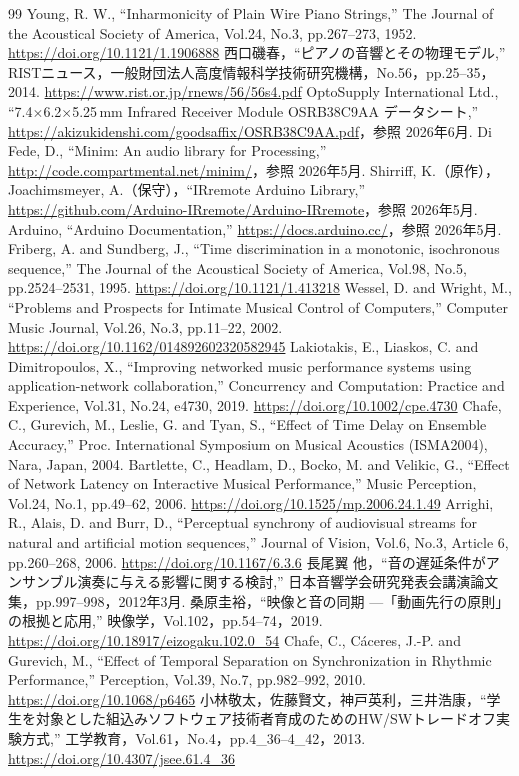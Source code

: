 \documentclass[uplatex,dvipdfmx]{jlreq}
\begin{document}
\begin{thebibliography}{99}
 Young, R. W., ``Inharmonicity of Plain Wire Piano Strings,'' The Journal of the Acoustical Society of America, Vol.24, No.3, pp.267--273, 1952. \url{https://doi.org/10.1121/1.1906888}
 西口磯春，``ピアノの音響とその物理モデル,'' RISTニュース，一般財団法人高度情報科学技術研究機構，No.56，pp.25--35，2014. \url{https://www.rist.or.jp/rnews/56/56s4.pdf}
 OptoSupply International Ltd., ``7.4$\times$6.2$\times$5.25\,mm Infrared Receiver Module OSRB38C9AA データシート,'' \url{https://akizukidenshi.com/goodsaffix/OSRB38C9AA.pdf}，参照 2026年6月.
 Di Fede, D., ``Minim: An audio library for Processing,'' \url{http://code.compartmental.net/minim/}，参照 2026年5月.
 Shirriff, K.（原作），Joachimsmeyer, A.（保守），``IRremote Arduino Library,'' \url{https://github.com/Arduino-IRremote/Arduino-IRremote}，参照 2026年5月.
 Arduino, ``Arduino Documentation,'' \url{https://docs.arduino.cc/}，参照 2026年5月.
 Friberg, A. and Sundberg, J., ``Time discrimination in a monotonic, isochronous sequence,'' The Journal of the Acoustical Society of America, Vol.98, No.5, pp.2524--2531, 1995. \url{https://doi.org/10.1121/1.413218}
 Wessel, D. and Wright, M., ``Problems and Prospects for Intimate Musical Control of Computers,'' Computer Music Journal, Vol.26, No.3, pp.11--22, 2002. \url{https://doi.org/10.1162/014892602320582945}
 Lakiotakis, E., Liaskos, C. and Dimitropoulos, X., ``Improving networked music performance systems using application-network collaboration,'' Concurrency and Computation: Practice and Experience, Vol.31, No.24, e4730, 2019. \url{https://doi.org/10.1002/cpe.4730}
 Chafe, C., Gurevich, M., Leslie, G. and Tyan, S., ``Effect of Time Delay on Ensemble Accuracy,'' Proc. International Symposium on Musical Acoustics (ISMA2004), Nara, Japan, 2004.
 Bartlette, C., Headlam, D., Bocko, M. and Velikic, G., ``Effect of Network Latency on Interactive Musical Performance,'' Music Perception, Vol.24, No.1, pp.49--62, 2006. \url{https://doi.org/10.1525/mp.2006.24.1.49}
 Arrighi, R., Alais, D. and Burr, D., ``Perceptual synchrony of audiovisual streams for natural and artificial motion sequences,'' Journal of Vision, Vol.6, No.3, Article 6, pp.260--268, 2006. \url{https://doi.org/10.1167/6.3.6}
 長尾翼 他，``音の遅延条件がアンサンブル演奏に与える影響に関する検討,'' 日本音響学会研究発表会講演論文集，pp.997--998，2012年3月.
 桑原圭裕，``映像と音の同期 ---「動画先行の原則」の根拠と応用,'' 映像学，Vol.102，pp.54--74，2019. \url{https://doi.org/10.18917/eizogaku.102.0_54}
 Chafe, C., C\'aceres, J.-P. and Gurevich, M., ``Effect of Temporal Separation on Synchronization in Rhythmic Performance,'' Perception, Vol.39, No.7, pp.982--992, 2010. \url{https://doi.org/10.1068/p6465}
 小林敬太，佐藤賢文，神戸英利，三井浩康，``学生を対象とした組込みソフトウェア技術者育成のためのHW/SWトレードオフ実験方式,'' 工学教育，Vol.61，No.4，pp.4\_36--4\_42，2013. \url{https://doi.org/10.4307/jsee.61.4_36}
\end{thebibliography}
\end{document}
